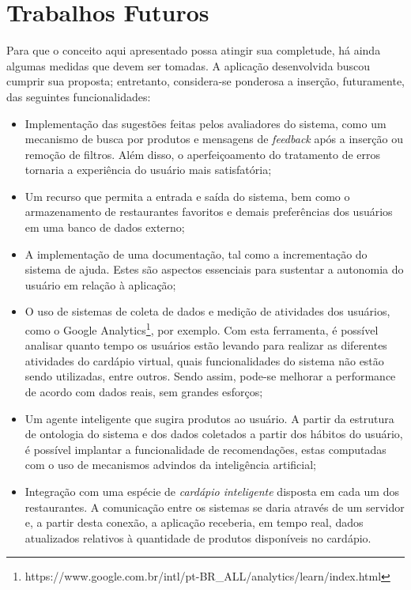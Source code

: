 \section{Trabalhos Futuros}

Para que o conceito aqui apresentado possa atingir sua completude, há ainda algumas medidas que devem ser tomadas. A aplicação desenvolvida buscou cumprir sua proposta; entretanto, considera-se ponderosa a inserção, futuramente, das seguintes funcionalidades:
\begin{itemize}
	\item Implementação das sugestões feitas pelos avaliadores do sistema, como um mecanismo de busca por produtos e mensagens de \emph{feedback} após a inserção ou remoção de filtros. Além disso, o aperfeiçoamento do tratamento de erros tornaria a experiência do usuário mais satisfatória;
	\item Um recurso que permita a entrada e saída do sistema, bem como o armazenamento de restaurantes favoritos e demais preferências dos usuários em uma banco de dados externo;
	\item A implementação de uma documentação, tal como a incrementação do sistema de ajuda. Estes são aspectos essenciais para sustentar a autonomia do usuário em relação à aplicação;
	\item O uso de sistemas de coleta de dados e medição de atividades dos usuários, como o Google Analytics\footnote{https://www.google.com.br/intl/pt-BR\_ALL/analytics/learn/index.html}, por exemplo. Com esta ferramenta, é possível analisar quanto tempo os usuários estão levando para realizar as diferentes atividades do cardápio virtual, quais funcionalidades do sistema não estão sendo utilizadas, entre outros. Sendo assim, pode-se melhorar a performance de acordo com dados reais, sem grandes esforços;
	\item Um agente inteligente que sugira produtos ao usuário. A partir da estrutura de ontologia do sistema e dos dados coletados a partir dos hábitos do usuário, é possível implantar a funcionalidade de recomendações, estas computadas com o uso de mecanismos advindos da inteligência artificial;
	\item Integração com uma espécie de \emph{cardápio inteligente} disposta em cada um dos restaurantes. A comunicação entre os sistemas se daria através de um servidor e, a partir desta conexão, a aplicação receberia, em tempo real, dados atualizados relativos à quantidade de produtos disponíveis no cardápio.
\end{itemize}